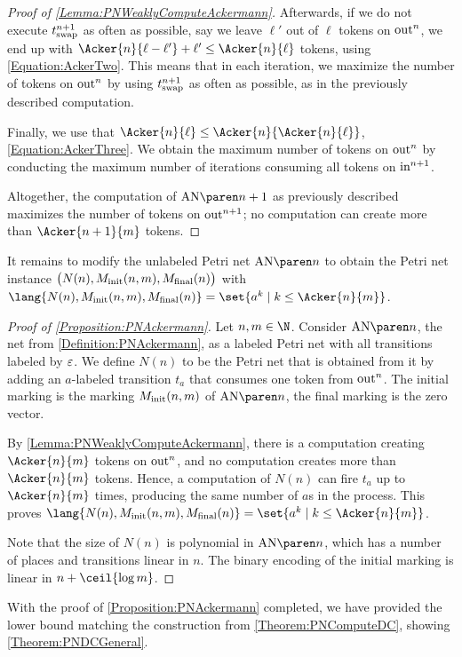 \documentclass[../../diss.tex]{subfiles}
\begin{document}
\begin{proof}[Proof of \cref{Lemma:PNWeaklyComputeAckermann}]
    Afterwards, if we do not execute $t_\text{swap}^{n+1}$ as often as possible, say we leave $\ell'$ out of $\ell$ tokens on $\text{out}^n$, we end up with $\Acker{n}{\ell - \ell'} + \ell' \leq \Acker{n}{\ell}$ tokens, using \cref{Equation:AckerTwo}.
    This means that in each iteration, we maximize the number of tokens on $\text{out}^n$ by using $t_\text{swap}^{n+1}$ as often as possible, as in the previously described computation.

    Finally, we use that $\Acker{n}{\ell} \leq \Acker{n}{\Acker{n}{\ell}}$, \cref{Equation:AckerThree}.
    We obtain the maximum number of tokens on $\text{out}^n$ by conducting the maximum number of iterations consuming all tokens on $\text{in}^{n+1}$.

    Altogether, the computation of $\AckerNet{n+1}$ as previously described maximizes the number of tokens on $\text{out}^{n+1}$; no computation can create more than $\Acker{n+1}{m}$ tokens.
\end{proof}

It remains to modify the unlabeled Petri net $\AckerNet{n}$ to obtain the Petri net instance $\big(N(n), M_{\text{init}}(n,m), M_{\text{final}}(n)\big)$ with $\lang{ N(n), \Minit(n,m), \Mfinal(n) } = \set{ a^k \mid k \leq \Acker{n}{m} }$.

\begin{proof}[Proof of \cref{Proposition:PNAckermann}]
    Let $n,m \in \N$.
    Consider $\AckerNet{n}$, the net from \cref{Definition:PNAckermann}, as a labeled Petri net with all transitions labeled by $\varepsilon$.
    We define $N(n)$ to be the Petri net that is obtained from it by adding an $a$-labeled transition $t_a$ that consumes one token from $\text{out}^n$.
    The initial marking is the marking $M_{\text{init}}(n,m)$ of $\AckerNet{n}$, the final marking is the zero vector.

    By \cref{Lemma:PNWeaklyComputeAckermann}, there is a computation creating $\Acker{n}{m}$ tokens on $\text{out}^n$, and no computation creates more than $\Acker{n}{m}$ tokens.
    Hence, a computation of $N(n)$ can fire $t_a$ up to $\Acker{n}{m}$ times, producing the same number of $a$s in the process.
    This proves $\lang{ N(n), \Minit(n,m), \Mfinal(n) } = \set{ a^k \mid k \leq \Acker{n}{m} }$.

    Note that the size of $N(n)$ is polynomial in $\AckerNet{n}$, which has a number of places and transitions linear in $n$.
    The binary encoding of the initial marking is linear in $n + \ceil{\log m}$.
\end{proof}

With the proof of \cref{Proposition:PNAckermann} completed, we have provided the lower bound matching the construction from \cref{Theorem:PNComputeDC}, showing \cref{Theorem:PNDCGeneral}.
\end{document}
